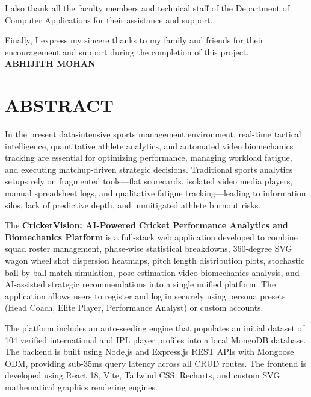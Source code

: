 \documentclass[12pt,a4paper]{report}
\begin{document}
I also thank all the faculty members and technical staff of the Department of Computer Applications for their assistance and support.

Finally, I express my sincere thanks to my family and friends for their encouragement and support during the completion of this project.\\[2.5cm]

\noindent
\hfill \textbf{ABHIJITH MOHAN}

\clearpage


\setcounter{page}{4}

\chapter*{ABSTRACT}
\justifying
In the present data-intensive sports management environment, real-time tactical intelligence, quantitative athlete analytics, and automated video biomechanics tracking are essential for optimizing performance, managing workload fatigue, and executing matchup-driven strategic decisions. Traditional sports analytics setups rely on fragmented tools—flat scorecards, isolated video media players, manual spreadsheet logs, and qualitative fatigue tracking—leading to information silos, lack of predictive depth, and unmitigated athlete burnout risks.

The \textbf{CricketVision: AI-Powered Cricket Performance Analytics and Biomechanics Platform} is a full-stack web application developed to combine squad roster management, phase-wise statistical breakdowns, 360-degree SVG wagon wheel shot dispersion heatmaps, pitch length distribution plots, stochastic ball-by-ball match simulation, pose-estimation video biomechanics analysis, and AI-assisted strategic recommendations into a single unified platform. The application allows users to register and log in securely using persona presets (Head Coach, Elite Player, Performance Analyst) or custom accounts.

The platform includes an auto-seeding engine that populates an initial dataset of 104 verified international and IPL player profiles into a local MongoDB database. The backend is built using Node.js and Express.js REST APIs with Mongoose ODM, providing sub-35ms query latency across all CRUD routes. The frontend is developed using React 18, Vite, Tailwind CSS, Recharts, and custom SVG mathematical graphics rendering engines.
\end{document}
